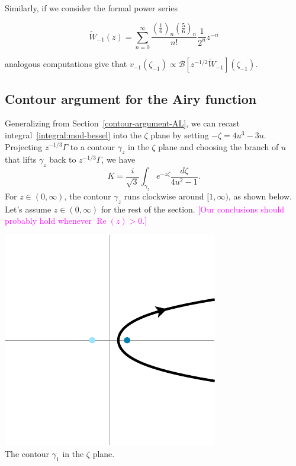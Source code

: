 \documentclass{article}
\begin{document}
Similarly, if we consider the formal power series

\begin{equation}
\tilde{W}_{-1}(z)=\sum_{n=0}^{\infty}\frac{\left(\frac{1}{6}\right)_n\left(\frac{5}{6}\right)_n}{n!}\frac{1}{2^n}z^{-n}
\end{equation}

analogous computations give that $v_{-1}(\zeta_{-1})\propto\mathcal{B}\left[z^{-1/2}\tilde{W}_{-1}\right](\zeta_{-1})$.

\subsection{Contour argument for the Airy function}\label{contour-argument}
Generalizing from Section~\ref{contour-argument-AL}, we can recast integral~\eqref{integral:mod-bessel} into the $\zeta$ plane by setting $-\zeta = 4u^3 - 3u$. Projecting $z^{-1/3} \Gamma$ to a contour $\gamma_z$ in the $\zeta$ plane and choosing the branch of $u$ that lifts $\gamma_z$ back to $z^{-1/3} \Gamma$, we have
\begin{equation}\label{integral:mod-bessel-zeta}
K = \frac{i}{\sqrt{3}} \int_{\gamma_z} e^{-z\zeta}\frac{d\zeta}{4u^2 - 1}.
\end{equation}
For $z \in (0, \infty)$, the contour $\gamma_z$ runs clockwise around $[1, \infty)$, as shown below. Let's assume $z \in (0, \infty)$ for the rest of the section. \textcolor{magenta}{[Our conclusions should probably hold whenever $\operatorname{Re}(z) > 0$.]}
\begin{center}
\includegraphics{figures/zeta_contour_3.pdf} \\[1em]
{\small The contour $\gamma_1$ in the $\zeta$ plane.}
\end{center}
\end{document}
